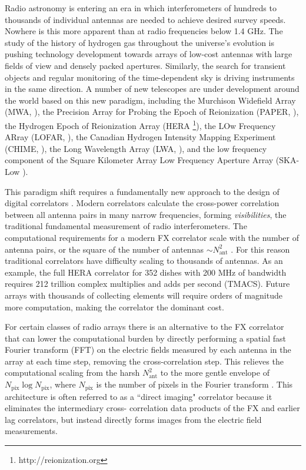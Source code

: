 \documentclass[a4paper,fleqn,usenatbib]{../mnras}
\newcommand{\Nant}{N_{\text{ant}}}
\newcommand{\Npix}{N_{\text{pix}}}
\begin{document}
Radio astronomy is entering an era in which interferometers of hundreds to
thousands of individual antennas are needed to achieve desired survey speeds.
Nowhere is this more apparent than at radio frequencies below 1.4 GHz. The study
of the history of hydrogen gas throughout the universe's evolution is pushing
technology development towards arrays of low-cost antennas with large fields of
view and densely packed apertures. Similarly, the search for transient objects
and regular monitoring of the time-dependent sky is driving instruments in the
same direction. A number of new telescopes are under development around the world
based on this new paradigm, including the Murchison Widefield Array (MWA,
\citealt{tin13}), the Precision Array for Probing the Epoch of Reionization
(PAPER, \citealt{par10}), the Hydrogen Epoch of Reionization Array (HERA
\footnote{http://reionization.org}), the LOw Frequency ARray (LOFAR,
\citealt{dev09}), the Canadian Hydrogen Intensity Mapping Experiment (CHIME,
\citealt{ban14}), the Long Wavelength Array (LWA, \citealt{ell13}), and the low
frequency component of the Square Kilometer Array Low Frequency Aperture Array
(SKA-Low \citealt{mel13}).

This paradigm shift requires a fundamentally new approach to the design of
digital correlators \citep{lon00}. Modern correlators calculate the cross-power
correlation between all antenna pairs in many narrow frequencies, forming
\emph{visibilities}, the traditional fundamental measurement of radio
interferometers. The computational requirements for a modern FX correlator scale
with the number of antenna pairs, or the square of the number of antennas $\sim
\Nant^2$ \citep{bun04}. For this reason traditional correlators have difficulty
scaling to thousands of antennas. As an example, the full HERA correlator for
352 dishes with 200 MHz of bandwidth requires 212 trillion complex multiplies
and adds per second (TMACS). Future arrays with thousands of collecting elements
will require orders of magnitude more computation, making the correlator the
dominant cost.

For certain classes of radio arrays there is an alternative to the FX correlator
that can lower the computational burden by directly performing a spatial fast
Fourier transform (FFT) on the electric fields measured by each antenna in the
array at each time step, removing the cross-correlation step. This relieves the
computational scaling from the harsh $\Nant^2$ to the more gentle envelope of
$\Npix\log\Npix$, where $\Npix$ is the number of pixels in the Fourier transform
\citep[e.g.][]{mor11,teg09,teg10}. This architecture is often referred to as a
``direct imaging" correlator because it eliminates the intermediary cross-
correlation data products of the FX and earlier lag correlators, but instead
directly forms images from the electric field measurements.
\end{document}
